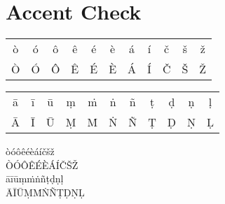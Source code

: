 
\chapter{Accent Check}

\noindent
\begin{tabular}{ccccccccccc}
ò & ó & ô & ê & é & è & á & í & č & š & ž\\
Ò & Ó & Ô & Ê & É & È & Á & Í & Č & Š & Ž\\
\end{tabular}

\noindent
\begin{tabular}{ccccccccccc}
ā & ī & ū & ṃ & ṁ & ṅ & ñ & ṭ & ḍ & ṇ & ḷ\\
Ā & Ī & Ū & Ṃ & Ṁ & Ṅ & Ñ & Ṭ & Ḍ & Ṇ & Ḷ\\
\end{tabular}

\noindent
òóôêéèáíčšž\\
ÒÓÔÊÉÈÁÍČŠŽ\\
āīūṃṁṅñṭḍṇḷ\\
ĀĪŪṂṀṄÑṬḌṆḶ
